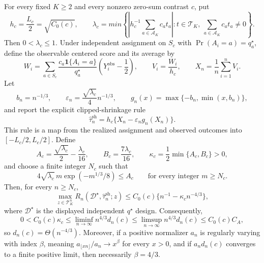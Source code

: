 For every fixed \(K\geq2\) and every nonzero zero-sum contrast \(c\), put
\[
 h_c=\frac{L_c}{2}=\sqrt{C_0(c)},
 \qquad
 \lambda_c=min\left\{
 \left|h_c^{-1}\sum_{a\in\mathcal A_K}c_at_a\right|:
 t\in\mathcal T_K,\ \sum_{a\in\mathcal A_K}c_at_a\neq0
 \right\}.
\]
Then \(0<\lambda_c\leq1\). Under independent assignment on \(S_c\) with \(\Pr(A_i=a)=q_a^\star\), define the observable centered score and its average by
\[
 W_i=\sum_{a\in S_c}\frac{c_a\mathbf 1\{A_i=a\}}{q_a^\star}
 \left(Y_i^{\mathrm{obs}}-\frac12\right),
 \qquad V_i=\frac{W_i}{h_c},
 \qquad X_n=\frac1n\sum_{i=1}^nV_i.
\]
Let
\[
 b_n=n^{-1/3},\qquad
 \varepsilon_n=\frac{\sqrt{\lambda_c}}4n^{-1/3},\qquad
 g_n(x)=\max\{-b_n,\min(x,b_n)\},
\]
and report the explicit clipped-shrinkage rule
\[
 \widehat\tau_n^{\mathrm{sh}}
 =h_c\{X_n-\varepsilon_ng_n(X_n)\}.
\]
This rule is a map from the realized assignment and observed outcomes into \([-L_c/2,L_c/2]\). Define
\[
 A_c=\frac{\sqrt{\lambda_c}}2-\frac{\lambda_c}{16},
 \qquad B_c=\frac{7\lambda_c}{16},
 \qquad \kappa_c=\frac12\min\{A_c,B_c\}>0,
\]
and choose a finite integer \(N_c\) such that
\[
 4\sqrt{\lambda_c}\,m\exp(-m^{1/3}/8)\leq A_c
 \qquad\text{for every integer }m\geq N_c.
\]
Then, for every \(n\geq N_c\),
\[
 \max_{z\in\mathcal T_K^n}
 R_n(\mathcal D^\star,\widehat\tau_n^{\mathrm{sh}};z)
 \leq C_0(c)\{n^{-1}-\kappa_cn^{-4/3}\},
\]
where \(\mathcal D^\star\) is the displayed independent \(q^\star\) design. Consequently,
\[
 0<C_0(c)\kappa_c
 \leq\liminf_{n\to\infty}n^{4/3}d_n(c)
 \leq\limsup_{n\to\infty}n^{4/3}d_n(c)
 \leq C_0(c)C_A,
\]
so \(d_n(c)=\Theta(n^{-4/3})\). Moreover, if a positive normalizer \(a_n\) is regularly varying with index \(\beta\), meaning \(a_{\lfloor xn\rfloor}/a_n\to x^\beta\) for every \(x>0\), and if \(a_nd_n(c)\) converges to a finite positive limit, then necessarily \(\beta=4/3\).